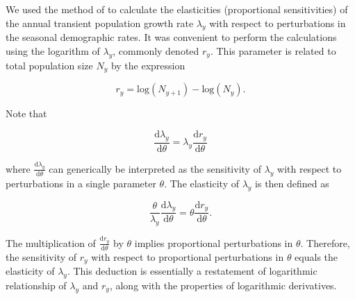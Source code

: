 \documentclass[11pt]{article}
\begin{document}
We used the method of \cite{caswell2007sensitivity} to calculate the elasticities 
(proportional sensitivities) of the annual transient population growth rate $\lambda_y$
with respect to perturbations in the seasonal demographic rates.
It was convenient to perform the calculations using the logarithm of $\lambda_y$,
commonly denoted $r_y$.
This parameter is related to total population size $N_y$ by the expression
%
\begin{linenomath*}
\begin{equation} \label{eq:r}
r_y = \textrm{log}\left(N_{y+1}\right) - \textrm{log}\left({N_y}\right).
\end{equation}
\end{linenomath*}
%
Note that
%
\begin{linenomath*}
\begin{equation} \label{eq:lsens}
\frac{\textrm{d}\lambda_y}{\textrm{d}\theta} = \lambda_y \frac{\textrm{d}r_y}{\textrm{d}\theta}
\end{equation}
\end{linenomath*}
%
where $\frac{\textrm{d}\lambda_y}{\textrm{d}\theta}$ can generically be interpreted
as the sensitivity of $\lambda_y$ with respect to perturbations 
in a single parameter $\theta$.
The elasticity of $\lambda_y$ is then defined as
%
\begin{linenomath*}
\begin{equation} \label{eq:lelas}
\frac{\theta}{\lambda_y} \frac{\textrm{d}\lambda_y}{\textrm{d}\theta} = 
        \theta\frac{\textrm{d}r_y}{\textrm{d}\theta}.
\end{equation}
\end{linenomath*}
%
The multiplication of $\frac{\textrm{d}r_y}{\textrm{d}\theta}$ by $\theta$  
implies proportional perturbations in $\theta$.
Therefore, the sensitivity of $r_y$ with respect to proportional perturbations in $\theta$
equals the elasticity of $\lambda_y$.
This deduction is essentially a restatement of logarithmic relationship of $\lambda_y$
and $r_y$, along with the properties of logarithmic derivatives.
\end{document}
